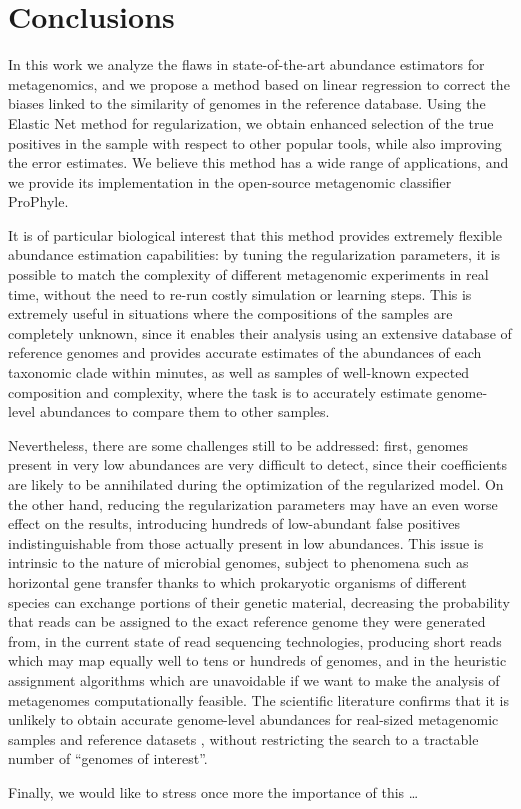 
\chapter{Conclusions}
\label{Chapter5}

In this work we analyze the flaws in state-of-the-art abundance estimators for metagenomics, and we propose a method based on linear regression to correct the biases linked to the similarity of genomes in the reference database. Using the Elastic Net method for regularization, we obtain enhanced selection of the true positives in the sample with respect to other popular tools, while also improving the error estimates. We believe this method has a wide range of applications, and we provide its implementation in the open-source metagenomic classifier ProPhyle.

It is of particular biological interest that this method provides extremely flexible abundance estimation capabilities: by tuning the regularization parameters, it is possible to match the complexity of different metagenomic experiments in real time, without the need to re-run costly simulation or learning steps. This is extremely useful in situations where the compositions of the samples are completely unknown, since it enables their analysis using an extensive database of reference genomes and provides accurate estimates of the abundances of each taxonomic clade within minutes, as well as samples of well-known expected composition and complexity, where the task is to accurately estimate genome-level abundances to compare them to other samples.

Nevertheless, there are some challenges still to be addressed: first, genomes present in very low abundances are very difficult to detect, since their coefficients are likely to be annihilated during the optimization of the regularized model. On the other hand, reducing the regularization parameters may have an even worse effect on the results, introducing hundreds of low-abundant false positives indistinguishable from those actually present in low abundances. This issue is intrinsic to the nature of microbial genomes, subject to phenomena such as horizontal gene transfer thanks to which prokaryotic organisms of different species can exchange portions of their genetic material, decreasing the probability that reads can be assigned to the exact reference genome they were generated from, in the current state of read sequencing technologies, producing short reads which may map equally well to tens or hundreds of genomes, and in the heuristic assignment algorithms which are unavoidable if we want to make the analysis of metagenomes computationally feasible. The scientific literature confirms that it is unlikely to obtain accurate genome-level abundances for real-sized metagenomic samples and reference datasets \cite{lindgreen_evaluation_2016,nasko_refseq_2018,fischer_abundance_2017}, without restricting the search to a tractable number of ``genomes of interest''.

Finally, we would like to stress once more the importance of this \dots
